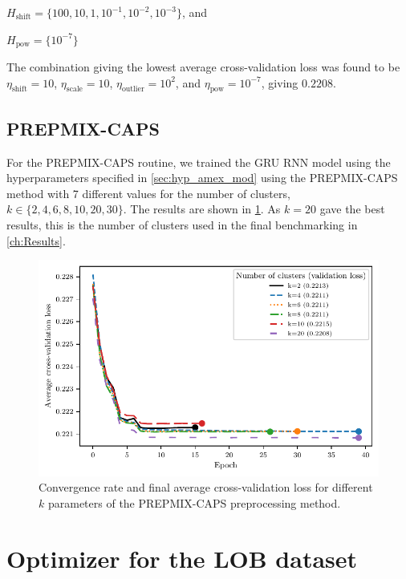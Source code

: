 \documentclass{statsmsc}
\begin{document}
{$H_{\textrm{shift}}=\{100, 10, 1, 10^{-1}, 10^{-2}, 10^{-3}\}$, and

$H_{\textrm{pow}}=\{10^{-7}\}$

The combination giving the lowest average cross-validation loss was found to be
$\eta_{\textrm{shift}}=10$,
$\eta_{\textrm{scale}}=10$,
$\eta_{\textrm{outlier}}=10^{2}$, and
$\eta_{\textrm{pow}}=10^{-7}$, giving $0.2208$.

\subsection{PREPMIX-CAPS}

For the \ac{PREPMIX-CAPS} routine, we trained the \ac{GRU} \ac{RNN} model
using the hyperparameters specified in \cref{sec:hyp_amex_mod} using the \ac{PREPMIX-CAPS}
method with 7 different values for the number of clusters, $k \in \{2, 4, 6, 8, 10, 20, 30\}$.
The results are shown in \cref{fig:prepmix_tune}. As $k=20$ gave the best results, this is
the number of clusters used in the final benchmarking in \cref{ch:Results}.

\begin{figure}[htp]
    \begin{center}
        \includegraphics[scale=1]{figures/mixture-clustering-tuning.pdf}
    \end{center}
    \caption{Convergence rate and final average cross-validation loss for different $k$ parameters
    of the \ac{PREPMIX-CAPS} preprocessing method.}
    \label{fig:prepmix_tune}
\end{figure}

\section{Optimizer for the LOB dataset}%
\label{sec:hyp_lob_opt}

}
\end{document}
